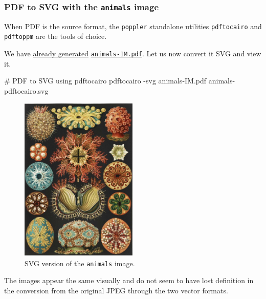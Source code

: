 \documentclass[
  11pt,
  british,
  a4paper,
]{article}
\newenvironment{Shaded}{\begin{snugshade}}{\end{snugshade}}
\newcommand{\AttributeTok}[1]{\textcolor[rgb]{0.80,0.80,0.80}{#1}}
\newcommand{\CommentTok}[1]{\textcolor[rgb]{0.50,0.62,0.50}{#1}}
\newcommand{\ExtensionTok}[1]{\textcolor[rgb]{0.80,0.80,0.80}{#1}}
\newcommand{\NormalTok}[1]{\textcolor[rgb]{0.80,0.80,0.80}{#1}}
\begin{document}
\hypertarget{pdf-to-svg-with-the-animals-image}{%
\subsubsection{\texorpdfstring{PDF to SVG with the \texttt{animals}
image}{PDF to SVG with the animals image}}\label{pdf-to-svg-with-the-animals-image}}

When PDF is the source format, the \texttt{poppler} standalone utilities
\texttt{pdftocairo} and \texttt{pdftoppm} are the tools of choice.

We have
\protect\hyperlink{raster-to-pdf-with-convert-for-animals}{already
generated} \href{images/animals-IM.pdf}{\texttt{animals-IM.pdf}}. Let us
now convert it SVG and view it.

\begin{Shaded}
\begin{Highlighting}[]
\CommentTok{\# PDF to SVG using pdftocairo}
\ExtensionTok{pdftocairo} \AttributeTok{{-}svg}\NormalTok{ animals{-}IM.pdf animals{-}pdftocairo.svg}
\end{Highlighting}
\end{Shaded}

\begin{figure}
\hypertarget{fig:animals-pdftocairo-svg}{%
\centering
\includegraphics[width=0.5\textwidth,height=\textheight]{images/animals-pdftocairo.svg}
\caption{SVG version of the \texttt{animals}
image.}\label{fig:animals-pdftocairo-svg}
}
\end{figure}

The images appear the same visually and do not seem to have lost
definition in the conversion from the original JPEG through the two
vector formats.
\end{document}

